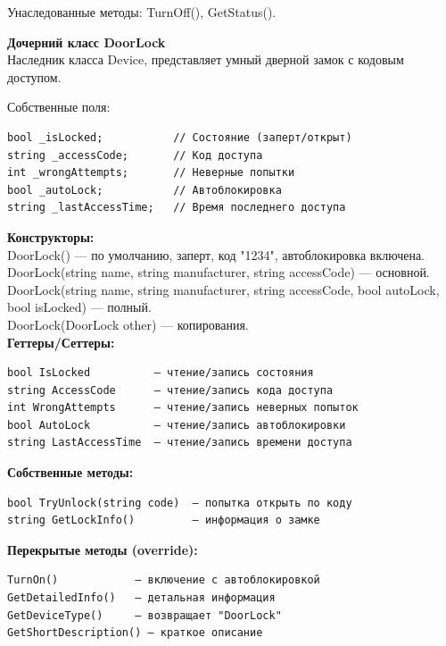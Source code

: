 \documentclass[oneside,a4paper,14pt]{extarticle}
\begin{document}
Унаследованные методы: TurnOff(), GetStatus().

\newpage

\textbf{Дочерний класс DoorLock}\\

Наследник класса Device, представляет умный дверной замок с кодовым доступом.

Собственные поля:

\begin{verbatim}
bool _isLocked;           // Состояние (заперт/открыт)
string _accessCode;       // Код доступа
int _wrongAttempts;       // Неверные попытки
bool _autoLock;           // Автоблокировка
string _lastAccessTime;   // Время последнего доступа
\end{verbatim}

\textbf{Конструкторы:}\\

DoorLock() — по умолчанию, заперт, код "1234", автоблокировка включена.\\

DoorLock(string name, string manufacturer, string accessCode) — основной.\\

DoorLock(string name, string manufacturer, string accessCode, bool autoLock, bool isLocked) — полный.\\

DoorLock(DoorLock other) — копирования.\\

\textbf{Геттеры/Сеттеры:}

\begin{verbatim}
bool IsLocked          — чтение/запись состояния
string AccessCode      — чтение/запись кода доступа
int WrongAttempts      — чтение/запись неверных попыток
bool AutoLock          — чтение/запись автоблокировки
string LastAccessTime  — чтение/запись времени доступа
\end{verbatim}

\textbf{Собственные методы:}

\begin{verbatim}
bool TryUnlock(string code)  — попытка открыть по коду
string GetLockInfo()         — информация о замке
\end{verbatim}

\textbf{Перекрытые методы (override):}

\begin{verbatim}
TurnOn()            — включение с автоблокировкой
GetDetailedInfo()   — детальная информация
GetDeviceType()     — возвращает "DoorLock"
GetShortDescription() — краткое описание
\end{verbatim}
\end{document}
